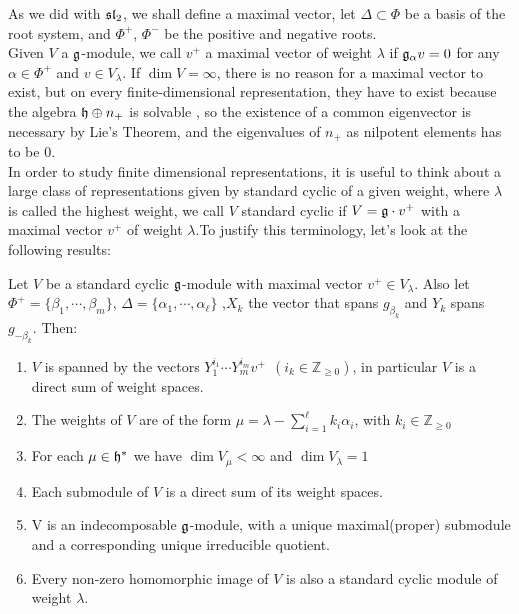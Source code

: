 As we did with $\mathfrak{sl}_2$, we shall define a maximal vector, let $\Delta \subset \Phi$ be a basis of the root system, and $\Phi^+$, $\Phi^-$ be the positive and negative roots.\\
Given $V$ a $\mathfrak{g}$-module, we call $v^+$ a maximal vector of weight $\lambda$ if $\mathfrak{g}_\alpha v = 0$ for any $\alpha \in \Phi^+$ and $v \in V_\lambda$. If $\dim V = \infty$, there is no reason for a maximal vector to exist, but on every finite-dimensional representation, they have to exist because the algebra $\mathfrak{h} \oplus n_+$ is solvable , so the existence of a common eigenvector is necessary by Lie's Theorem, and the eigenvalues of $n_+$ as nilpotent elements has to be $0$.\\
In order to study finite dimensional representations, it is useful to think about a large class of representations given by standard cyclic of a given weight, where $\lambda$ is called the highest weight, we call $V$ standard cyclic if $V=\mathfrak{g}\cdot v^+$ with a maximal vector $v^+$ of weight $\lambda$.To justify this terminology, let's look at the following results:
\begin{teo}
Let $V$ be a standard cyclic $\mathfrak{g}$-module with maximal vector $v^+ \in V_\lambda$. Also let $\Phi^+ = \{\beta_1,\cdots,\beta_m\}$, $\Delta = \{\alpha_1,\cdots,\alpha_\ell\}$ ,$X_k$ the vector that spans $g_{\beta_k}$ and $Y_k$ spans $g_{-\beta_k}$. Then:
\begin{enumerate}[label=(\alph*)]
\label{42standardcyclic}
\item $V$ is spanned by the vectors $Y_1^{i_1}\cdots Y_m^{i_m}v^+\ \ (i_k \in \mathbb{Z}_{\ge 0})$, in particular $V$ is a direct sum of weight spaces.
\item The weights of $V$ are of the form $\mu = \lambda - \sum_{i=1}^\ell k_i\alpha_i$, with $k_i \in \mathbb{Z}_{\ge 0}$ 
\item For each $\mu \in \mathfrak{h}^*$ we have $\dim V_\mu < \infty$ and $\dim V_\lambda = 1$
\item Each submodule of $V$ is a direct sum of its weight spaces.
\item V is an indecomposable $\mathfrak{g}$-module, with a unique maximal(proper) submodule and a corresponding unique irreducible quotient.
\item Every non-zero homomorphic image of $V$ is also a standard cyclic module of weight $\lambda$.
\end{enumerate}
\end{teo}
